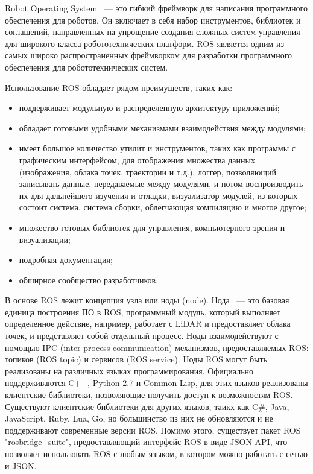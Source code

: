 Robot Operating System ~--- это гибкий фреймворк для написания программного обеспечения для роботов. Он включает в себя
набор инструментов, библиотек и соглашений, направленных на упрощение создания сложных систем управления для широкого
класса робототехнических платформ. ROS является одним из самых широко распространенных фреймворком для разработки
программного обеспечения для робототехнических систем.

Использование ROS обладает рядом преимуществ, таких как:
\begin{itemize}
    \item поддерживает модульную и распределенную архитектуру приложений;
    \item обладает готовыми удобными механизмами взаимодействия между модулями;
    \item имеет большое количество утилит и инструментов, таких как программы с графическим интерфейсом, для отображения
          множества данных (изображения, облака точек, траектории и т.д.), логгер, позволяющий записывать данные,
          передаваемые между модулями, и потом воспроизводить их для дальнейшего изучения и отладки, визуализатор
          модулей, из которых состоит система, система сборки, облегчающая компиляцию и многое другое;
    \item множество готовых библиотек для управления, компьютерного зрения и визуализации;
    \item подробная документация;
    \item обширное сообщество разработчиков.
\end{itemize}

В основе ROS лежит концепция узла или ноды (node). Нода ~--- это базовая единица построения ПО в ROS, программный модуль,
который выполняет определенное действие, например, работает с LiDAR и предоставляет облака точек, и представляет
собой отдельный процесс. Ноды взаимодействуют с помощью IPC (inter-process communication) механизмов, предоставляемых
ROS: топиков (ROS topic) и сервисов (ROS service). Ноды ROS могут быть реализованы на различных языках программирования.
Официально поддерживаются C++, Python 2.7 и Common Lisp, для этих языков реализованы клиентские библиотеки, позволяющие
получить доступ к возможностям ROS. Существуют клиентские библиотеки для других языков, таикх как C\#, Java, JavaScript,
Ruby, Lua, Go, но большинство из них не обновляются и не поддерживают современные версии ROS. Помимо этого, существует
пакет ROS "rosbridge\_suite", предоставляющий интерфейс ROS в виде JSON-API, что позволяет использовать ROS с любым языком,
в котором можно работать с сетью и JSON.

